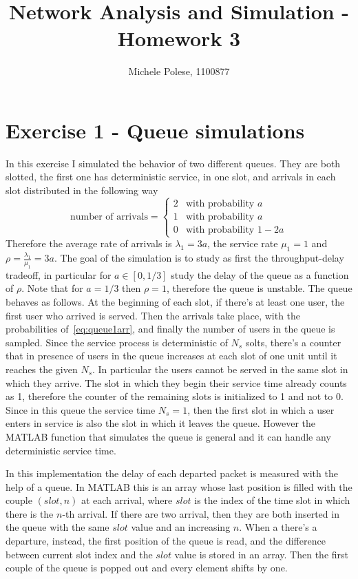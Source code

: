 \documentclass[10pt]{article}
\begin{document}
\title{Network Analysis and Simulation - Homework 3}
\author{Michele Polese, 1100877}

\maketitle

\section*{Exercise 1 - Queue simulations}
In this exercise I simulated the behavior of two different queues. They are both slotted, the first one has deterministic service, in one slot, and arrivals in each slot distributed in the following way
\begin{equation}
  \mbox{number of arrivals} = 
  \begin{cases}
    2 & \mbox{with probability } a\\
    1 & \mbox{with probability } a\\
    0 & \mbox{with probability } 1-2a
  \end{cases}
  \label{eq:queue1arr}
\end{equation}
Therefore the average rate of arrivals is $\lambda_1 = 3a$, the service rate $\mu_1 = 1$ and $\rho = \frac{\lambda_1}{\mu_1} = 3a$. 
The goal of the simulation is to study as first the throughput-delay tradeoff, in particular for $a \in [0, 1/3]$ study the delay of the queue as a function of $\rho$. Note that for $a = 1/3$ then $\rho = 1$, therefore the queue is unstable. 
The queue behaves as follows. At the beginning of each slot, if there's at least one user, the first user who arrived is served. Then the arrivals take place, with the probabilities of~\eqref{eq:queue1arr}, and finally the number of users in the queue is sampled. Since the service process is deterministic of $N_s$ solts, there's a counter that in presence of users in the queue increases at each slot of one unit until it reaches the given $N_s$. In particular the users cannot be served in the same slot in which they arrive. The slot in which they begin their service time already counts as 1, therefore the counter of the remaining slots is initialized to 1 and not to 0. Since in this queue the service time $N_s = 1$, then the first slot in which a user enters in service is also the slot in which it leaves the queue. However the MATLAB function that simulates the queue is general and it can handle any deterministic service time. 

In this implementation the delay of each departed packet is measured with the help of a queue. In MATLAB this is an array whose last position is filled with the couple $(slot, n)$ at each arrival, where $slot$ is the index of the time slot in which there is the $n$-th arrival. If there are two arrival, then they are both inserted in the queue with the same $slot$ value and an increasing $n$. When a there's a departure, instead, the first position of the queue is read, and the difference between current slot index and the $slot$ value is stored in an array. Then the first couple of the queue is popped out and every element shifts by one. 
\end{document}
